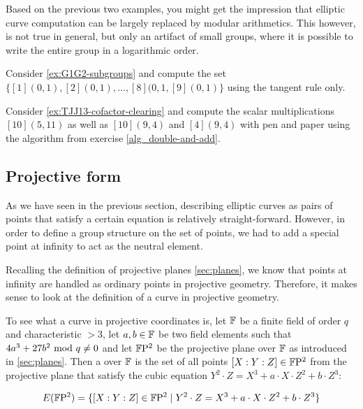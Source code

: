 Based on the previous two examples, you  might get the impression that elliptic curve computation can be largely replaced by modular arithmetics. This however, is not true in general, but only an artifact of small groups, where it is possible to write the entire group in a logarithmic order.
\begin{exercise} Consider \examplename{} \ref{ex:G1G2-subgroups} and compute the set 
$\{[1](0,1), [2](0,1),\ldots,[8](0,1,[9](0,1)\}$ using the tangent rule only.
\end{exercise}
\begin{exercise} Consider \examplename{} \ref{ex:TJJ13-cofactor-clearing} and compute the scalar multiplications $[10](5,11)$ as well as $[10](9,4)$ and $[4](9,4)$ with pen and paper using the algorithm from exercise \ref{alg_double-and-add}.
\end{exercise}
\subsection{Projective  form}
As we have seen in the previous section, describing elliptic curves as pairs of points that satisfy a certain equation is relatively straight-forward. However, in order to define a group structure on the set of points, we had to add a special point at infinity to act as the neutral element. 

Recalling the definition of projective planes \ref{sec:planes}, we know that points at infinity are handled as ordinary points in projective geometry. Therefore, it makes  sense to look at the definition of a  curve in projective geometry.

To see what a  curve in projective coordinates is, let $\mathbb{F}$ be a finite field of order $q$ and characteristic $>3$, let $a,b\in \mathbb{F}$ be two field elements such that $4a^3+ 27b^2 \text{ mod } q\neq 0$ and let $\mathbb{F}\mathrm{P}^2$ be the projective plane over $\mathbb{F}$ as introduced in \secname{} \ref{sec:planes}. Then a  over $\mathbb{F}$ is the set of all points $[X:Y:Z]\in \mathbb{F}\mathrm{P}^2$ from the projective plane that satisfy the cubic equation $Y^2\cdot Z = X^3+a\cdot X\cdot Z^2 + b\cdot Z^3$:

\begin{equation}
\label{def:projective_cubic_equation}
E(\mathbb{F}\mathrm{P}^2) = \{[X:Y:Z]\in \mathbb{F}\mathrm{P}^2\;|\; Y^2\cdot Z = X^3+a\cdot X\cdot Z^2 + b\cdot Z^3 \}
\end{equation}

